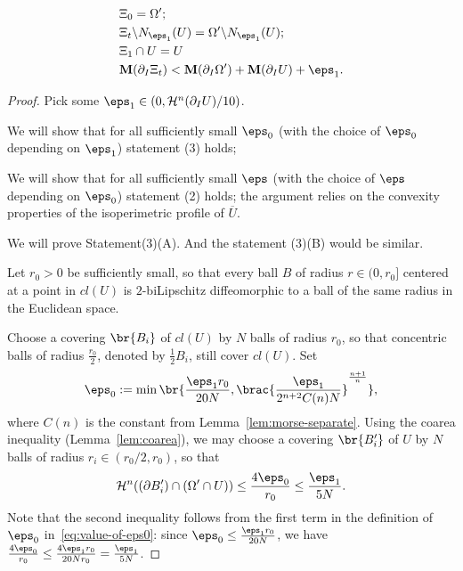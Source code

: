 \begin{lemma}
\begin{enumerate}
\begin{enumerate}
            \begin{equation*}
                \begin{split}
                    &\Xi_0 = \Omega';\\
                    &\Xi_t\backslash N_{\eps_1}(U) = \Omega'\backslash N_{\eps_1}(U);\\
                    &\Xi_1\cap U = U\\
                    &\mathbf{M}(\partial_I\Xi_t) < \mathbf{M}(\partial_I\Omega') + \mathbf{M}(\partial_IU) + \eps_1.
                \end{split}
            \end{equation*}
        \end{enumerate}
    \end{enumerate}
    \begin{proof}
        Pick some $\eps_1 \in (0, \mathcal{H}^{n}(\partial_IU)/10)$. 
        
        We will show that for all sufficiently small $\eps_0$ (with the choice of $\eps_0$ depending on $\eps_1$) statement (3) holds;  

        We will show that for all sufficiently small $\eps$ (with the choice of $\eps$ depending on $\eps_0$) statement (2) holds; the argument relies on the convexity properties of the isoperimetric profile of $\overline{U}$.

        We will prove Statement(3)(A). And the statement (3)(B) would be similar.

        Let $r_0 > 0$ be sufficiently small, so that every ball $B$ of radius $r \in (0, r_0]$ centered at a point in $cl(U)$ is $2$-biLipschitz diffeomorphic to a ball of the same radius in the Euclidean space.

        Choose a covering $\br{B_i}$ of $cl(U)$ by $N$ balls of radius $r_0$, so that concentric balls of radius $\frac{r_0}{2}$, denoted by $\frac{1}{2}B_i$, still cover $cl(U)$. Set
        \begin{equation}\label{eq:value-of-eps0}
            \eps_0 := \min\br{\frac{\eps_1 r_0}{20 N}, \brac{\frac{\eps_1}{2^{n + 2}C(n)N}}^{\frac{n + 1}{n}}},
        \end{equation}
        where $C(n)$ is the constant from Lemma~\ref{lem:morse-separate}. Using the coarea inequality (Lemma~\ref{lem:coarea}), we may choose a covering $\br{B_i'}$ of $U$ by $N$ balls of radius $r_i \in (r_0/2, r_0)$, so that         \begin{equation}\label{eq:area-of-Bi}
            \mathcal{H}^n((\partial B_i')\cap(\Omega'\cap U)) \leq \frac{4\eps_0}{r_0} \leq \frac{\eps_1}{5N}.
        \end{equation}
        Note that the second inequality follows from the first term in the definition of $\eps_0$ in~\eqref{eq:value-of-eps0}: since $\eps_0 \leq \frac{\eps_1 r_0}{20N}$, we have $\frac{4\eps_0}{r_0} \leq \frac{4\eps_1 r_0}{20Nr_0} = \frac{\eps_1}{5N}$.


\end{proof}
\end{lemma}
